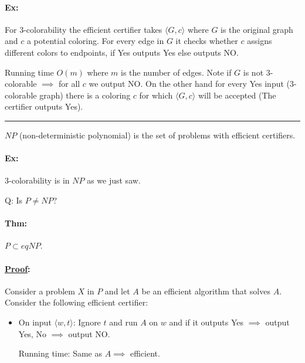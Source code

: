\documentclass[12 pt]{article}
\begin{document}
          \paragraph{Ex:} For 3-colorability the efficient certifier
          takes $\langle G, c \rangle$ where $G$ is the original graph
          and $c$ a potential coloring. For every edge in $G$ it
          checks whether $c$ assigns different colors to endpoints, if
          Yes outputs Yes else outputs NO.

          Running time $O(m)$ where $m$ is the number of edges. Note
          if $G$ is not 3-colorable $\implies$ for all $c$ we output
          NO. On the other hand for every Yes input (3-colorable
          graph) there is a coloring $c$ for which $\langle G, c
          \rangle$ will be accepted (The certifier outputs Yes).
          \\ \noindent \rule{\textwidth}{0.5pt}
          $NP$ (non-deterministic polynomial) is the set of problems
          with efficient certifiers.
          \paragraph{Ex:} 3-colorability is in $NP$ as we just saw.

          Q: Is $P \neq NP$?
          \paragraph{Thm:} $P \subset eq NP$.
          \paragraph{\underline{Proof}:} Consider a problem $X$ in $P$
          and let $A$ be an efficient algorithm that solves
          $A$. Consider the following efficient certifier:
          \begin{itemize}
          \item On input $\langle w, t \rangle$: Ignore $t$ and run
            $A$ on $w$ and if it outputs Yes $\implies $ output Yes,
            No $\implies$ output NO.

            Running time: Same as $A \implies$ efficient.
          \end{itemize}
        
\end{document}
